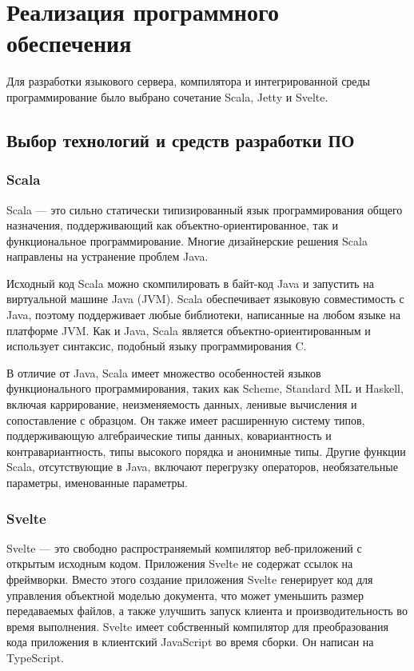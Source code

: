 \chapter{Реализация программного обеспечения}\label{ch:ch3}

Для разработки языкового сервера, компилятора и интегрированной среды
программирование было выбрано сочетание Scala, Jetty и Svelte.

\section{Выбор технологий и средств разработки ПО}\label{sec:ch3/sect1}

\subsection{Scala}\label{sec:ch3/sect1/subsect1}

Scala --- это сильно статически типизированный язык программирования общего назначения, поддерживающий как объектно-ориентированное, так и функциональное программирование. Многие дизайнерские решения Scala направлены на устранение проблем Java.

Исходный код Scala можно скомпилировать в байт-код Java и запустить на виртуальной машине Java (JVM). Scala обеспечивает языковую совместимость с Java, поэтому поддерживает любые библиотеки, написанные на любом языке на платформе JVM. Как и Java, Scala является объектно-ориентированным и использует синтаксис, подобный языку программирования C. 

В отличие от Java, Scala имеет множество особенностей языков функционального программирования, таких как Scheme, Standard ML и Haskell, включая каррирование, неизменяемость данных, ленивые вычисления и сопоставление с образцом. Он также имеет расширенную систему типов, поддерживающую алгебраические типы данных, ковариантность и контравариантность, типы высокого порядка и анонимные типы. Другие функции Scala, отсутствующие в Java, включают перегрузку операторов, необязательные параметры, именованные параметры.

\subsection{Svelte}\label{sec:ch3/sect1/subsect2}

Svelte --- это свободно распространяемый компилятор веб-приложений с открытым исходным кодом. Приложения Svelte не содержат ссылок на фреймворки. Вместо этого создание приложения Svelte генерирует код для управления объектной моделью документа, что может уменьшить размер передаваемых файлов, а также улучшить запуск клиента и производительность во время выполнения. Svelte имеет собственный компилятор для преобразования кода приложения в клиентский JavaScript во время сборки. Он написан на TypeScript. 

